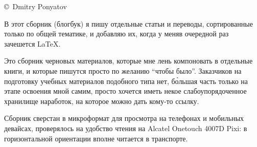
\copyright\ Dmitry Ponyatov 
\bigskip

В этот сборник (блогбук) я пишу отдельные статьи и переводы, сортированные
только по общей тематике, и добавляю их, когда у меняв очередной раз зачешется
\LaTeX.

Это сборник черновых материалов, которые мне лень компоновать в отдельные книги,
и которые пишутся просто по желанию ``чтобы было''. Заказчиков на подготовку
учебных материалов подобного типа нет, б\`{о}льшая часть только на этапе
освоения мной самим, просто хочется иметь некое слабоупорядоченное хранилище
наработок, на которое можно дать кому-то ссылку.

Сборник сверстан в микроформат для просмотра на телефонах и
мобильных девайсах, проверялось на удобство чтения на Alcatel Onetouch 4007D
Pixi: в горизонтальной ориентации вполне читается в транспорте.
